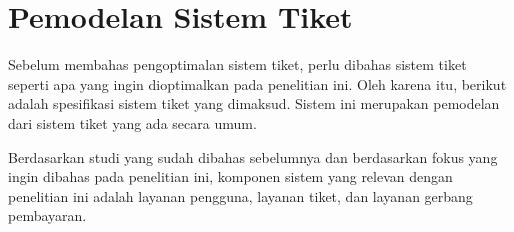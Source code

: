\section{Pemodelan Sistem Tiket}
\label{apx:analisis-kebutuhan}

Sebelum membahas pengoptimalan sistem tiket, perlu dibahas sistem tiket seperti apa yang ingin dioptimalkan pada penelitian ini. Oleh karena itu, berikut adalah spesifikasi sistem tiket yang dimaksud. Sistem ini merupakan pemodelan dari sistem tiket yang ada secara umum.

Berdasarkan studi yang sudah dibahas sebelumnya dan berdasarkan fokus yang ingin dibahas pada penelitian ini, komponen sistem yang relevan dengan penelitian ini adalah layanan pengguna, layanan tiket, dan layanan gerbang pembayaran.





\pagebreak


